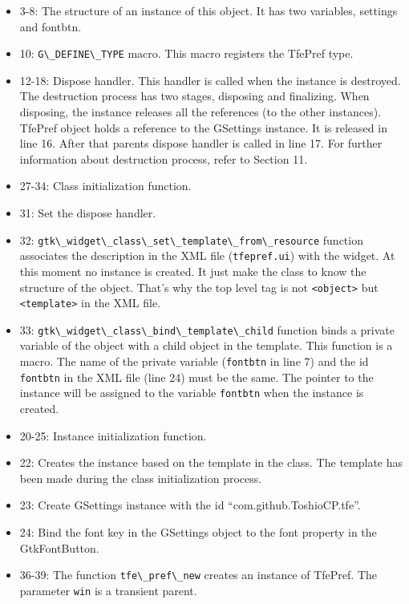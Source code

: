 \begin{itemize}
\tightlist
\item
  3-8: The structure of an instance of this object. It has two
  variables, settings and fontbtn.
\item
  10: \passthrough{\lstinline!G\_DEFINE\_TYPE!} macro. This macro
  registers the TfePref type.
\item
  12-18: Dispose handler. This handler is called when the instance is
  destroyed. The destruction process has two stages, disposing and
  finalizing. When disposing, the instance releases all the references
  (to the other instances). TfePref object holds a reference to the
  GSettings instance. It is released in line 16. After that parents
  dispose handler is called in line 17. For further information about
  destruction process, refer to Section 11.
\item
  27-34: Class initialization function.
\item
  31: Set the dispose handler.
\item
  32:
  \passthrough{\lstinline!gtk\_widget\_class\_set\_template\_from\_resource!}
  function associates the description in the XML file
  (\passthrough{\lstinline!tfepref.ui!}) with the widget. At this moment
  no instance is created. It just make the class to know the structure
  of the object. That's why the top level tag is not
  \passthrough{\lstinline!<object>!} but
  \passthrough{\lstinline!<template>!} in the XML file.
\item
  33:
  \passthrough{\lstinline!gtk\_widget\_class\_bind\_template\_child!}
  function binds a private variable of the object with a child object in
  the template. This function is a macro. The name of the private
  variable (\passthrough{\lstinline!fontbtn!} in line 7) and the id
  \passthrough{\lstinline!fontbtn!} in the XML file (line 24) must be
  the same. The pointer to the instance will be assigned to the variable
  \passthrough{\lstinline!fontbtn!} when the instance is created.
\item
  20-25: Instance initialization function.
\item
  22: Creates the instance based on the template in the class. The
  template has been made during the class initialization process.
\item
  23: Create GSettings instance with the id ``com.github.ToshioCP.tfe''.
\item
  24: Bind the font key in the GSettings object to the font property in
  the GtkFontButton.
\item
  36-39: The function \passthrough{\lstinline!tfe\_pref\_new!} creates
  an instance of TfePref. The parameter \passthrough{\lstinline!win!} is
  a transient parent.
\end{itemize}

